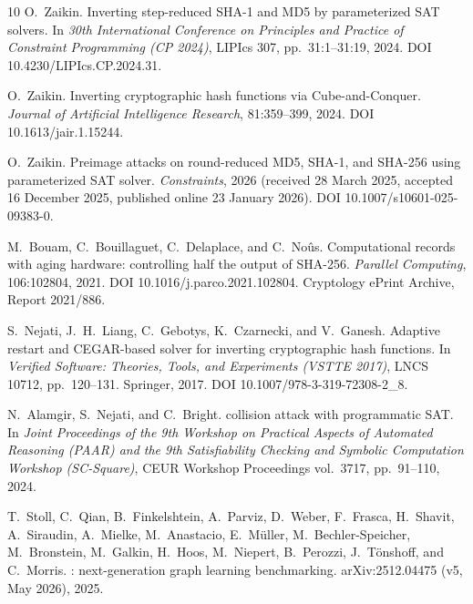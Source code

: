 \documentclass[11pt,a4paper]{article}
\begin{document}
\begin{thebibliography}{10}
O.~Zaikin.
\newblock Inverting step-reduced {SHA-1} and {MD5} by parameterized {SAT}
  solvers.
\newblock In \emph{30th International Conference on Principles and Practice
  of Constraint Programming (CP 2024)}, LIPIcs 307, pp.~31:1--31:19, 2024.
  DOI 10.4230/LIPIcs.CP.2024.31.

O.~Zaikin.
\newblock Inverting cryptographic hash functions via {Cube-and-Conquer}.
\newblock \emph{Journal of Artificial Intelligence Research}, 81:359--399,
  2024.  DOI 10.1613/jair.1.15244.

O.~Zaikin.
\newblock Preimage attacks on round-reduced {MD5}, {SHA-1}, and {SHA-256}
  using parameterized {SAT} solver.
\newblock \emph{Constraints}, 2026 (received 28 March 2025, accepted 16 December
  2025, published online 23 January 2026).  DOI 10.1007/s10601-025-09383-0.

M.~Bouam, C.~Bouillaguet, C.~Delaplace, and C.~No\^us.
\newblock Computational records with aging hardware: controlling half the
  output of {SHA-256}.
\newblock \emph{Parallel Computing}, 106:102804, 2021.
  DOI 10.1016/j.parco.2021.102804.  Cryptology ePrint Archive, Report
  2021/886.

S.~Nejati, J.~H.~Liang, C.~Gebotys, K.~Czarnecki, and V.~Ganesh.
\newblock Adaptive restart and {CEGAR}-based solver for inverting
  cryptographic hash functions.
\newblock In \emph{Verified Software: Theories, Tools, and Experiments
  (VSTTE 2017)}, LNCS 10712, pp.~120--131. Springer, 2017.
  DOI 10.1007/978-3-319-72308-2\_8.

N.~Alamgir, S.~Nejati, and C.~Bright.
 collision attack with programmatic {SAT}.
\newblock In \emph{Joint Proceedings of the 9th Workshop on Practical
  Aspects of Automated Reasoning (PAAR) and the 9th Satisfiability Checking
  and Symbolic Computation Workshop (SC-Square)}, CEUR Workshop Proceedings
  vol.~3717, pp.~91--110, 2024.

T.~Stoll, C.~Qian, B.~Finkelshtein, A.~Parviz, D.~Weber, F.~Frasca,
  H.~Shavit, A.~Siraudin, A.~Mielke, M.~Anastacio, E.~M\"uller,
  M.~Bechler-Speicher, M.~Bronstein, M.~Galkin, H.~Hoos, M.~Niepert,
  B.~Perozzi, J.~T\"onshoff, and C.~Morris.
: next-generation graph learning benchmarking.
\newblock arXiv:2512.04475 (v5, May 2026), 2025.

\end{thebibliography}
\end{document}
